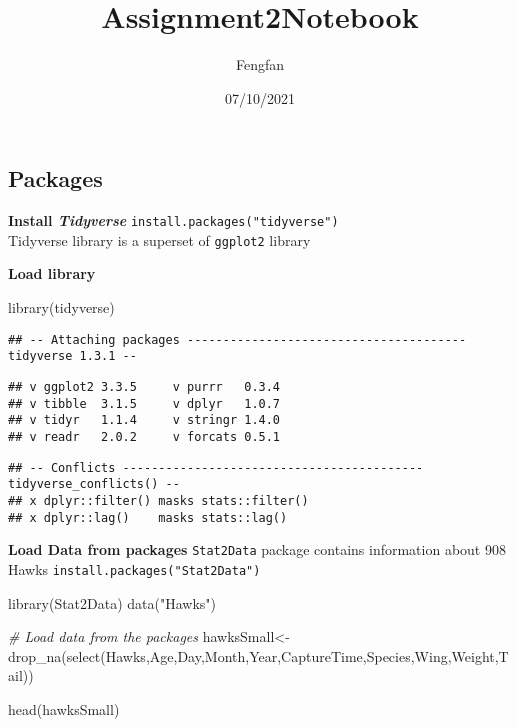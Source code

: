 \documentclass[
]{article}
\title{Assignment2Notebook}
\author{Fengfan}
\date{07/10/2021}
\newenvironment{Shaded}{\begin{snugshade}}{\end{snugshade}}
\newcommand{\CommentTok}[1]{\textcolor[rgb]{0.56,0.35,0.01}{\textit{#1}}}
\newcommand{\FunctionTok}[1]{\textcolor[rgb]{0.00,0.00,0.00}{#1}}
\newcommand{\NormalTok}[1]{#1}
\newcommand{\OtherTok}[1]{\textcolor[rgb]{0.56,0.35,0.01}{#1}}
\newcommand{\StringTok}[1]{\textcolor[rgb]{0.31,0.60,0.02}{#1}}
\begin{document}
\maketitle

\hypertarget{packages}{%
\subsection{Packages}\label{packages}}

\textbf{Install \emph{Tidyverse} }
\texttt{install.packages("tidyverse")}\\
Tidyverse library is a superset of \texttt{ggplot2} library

\textbf{Load library}

\begin{Shaded}
\begin{Highlighting}[]
\FunctionTok{library}\NormalTok{(tidyverse)}
\end{Highlighting}
\end{Shaded}

\begin{verbatim}
## -- Attaching packages --------------------------------------- tidyverse 1.3.1 --
\end{verbatim}

\begin{verbatim}
## v ggplot2 3.3.5     v purrr   0.3.4
## v tibble  3.1.5     v dplyr   1.0.7
## v tidyr   1.1.4     v stringr 1.4.0
## v readr   2.0.2     v forcats 0.5.1
\end{verbatim}

\begin{verbatim}
## -- Conflicts ------------------------------------------ tidyverse_conflicts() --
## x dplyr::filter() masks stats::filter()
## x dplyr::lag()    masks stats::lag()
\end{verbatim}

\textbf{Load Data from packages} \texttt{Stat2Data} package contains
information about 908 Hawks \texttt{install.packages("Stat2Data")}

\begin{Shaded}
\begin{Highlighting}[]
\FunctionTok{library}\NormalTok{(Stat2Data)}
\FunctionTok{data}\NormalTok{(}\StringTok{"Hawks"}\NormalTok{)}

\CommentTok{\# Load data from the packages}
\NormalTok{hawksSmall}\OtherTok{\textless{}{-}}\FunctionTok{drop\_na}\NormalTok{(}\FunctionTok{select}\NormalTok{(Hawks,Age,Day,Month,Year,CaptureTime,Species,Wing,Weight,Tail))}

\FunctionTok{head}\NormalTok{(hawksSmall)}
\end{Highlighting}
\end{Shaded}
\end{document}
